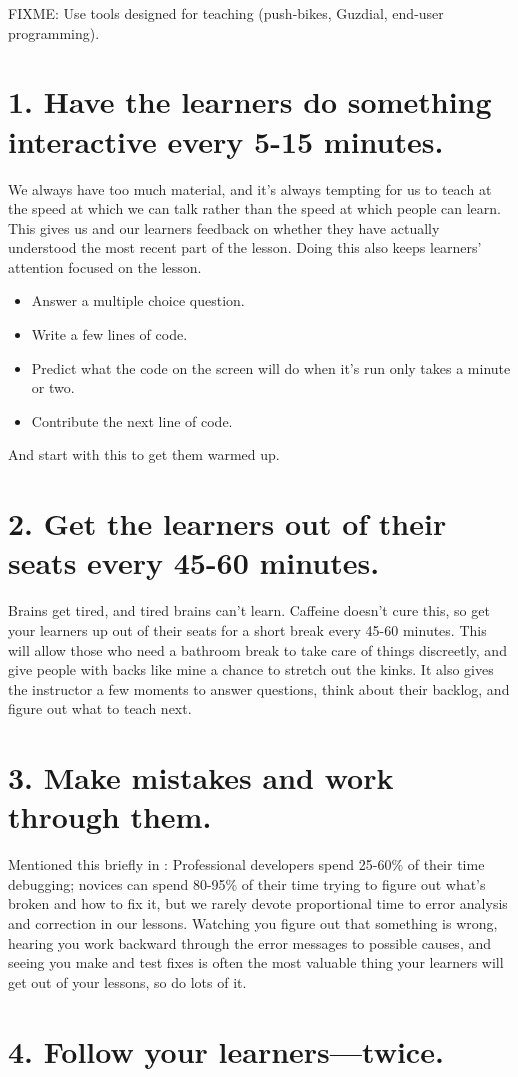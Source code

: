 \documentclass[10pt,letterpaper]{article}
\newcommand{\rulemajor}[1]{\section{#1}}
\begin{document}
\item FIXME: Use tools designed for teaching (push-bikes, Guzdial, end-user programming).

\rulemajor{1. Have the learners do something interactive every 5-15 minutes.}

We always have too much material,
and it's always tempting for us to teach at the speed at which we can talk
rather than the speed at which people can learn.
This gives us and our learners feedback on whether they have actually understood the most recent part of the lesson.
Doing this also keeps learners' attention focused on the lesson.

\begin{itemize}
\item Answer a multiple choice question.
\item Write a few lines of code.
\item Predict what the code on the screen will do when it's run only takes a minute or two.
\item Contribute the next line of code.
\end{itemize}

And start with this to get them warmed up.

\rulemajor{2. Get the learners out of their seats every 45-60 minutes.}

Brains get tired, and tired brains can't learn.
Caffeine doesn't cure this,
so get your learners up out of their seats for a short break every 45-60 minutes.
This will allow those who need a bathroom break to take care of things discreetly,
and give people with backs like mine a chance to stretch out the kinks.
It also gives the instructor a few moments to answer questions,
think about their backlog,
and figure out what to teach next.

\rulemajor{3. Make mistakes and work through them.}

Mentioned this briefly in \cite{Brow2018}:
Professional developers spend 25-60\% of their time debugging;
novices can spend 80-95\% of their time trying to figure out what's broken and how to fix it,
but we rarely devote proportional time to error analysis and correction in our lessons.
Watching you figure out that something is wrong,
hearing you work backward through the error messages to possible causes,
and seeing you make and test fixes is often the most valuable thing your learners will get out of your lessons,
so do lots of it.

\rulemajor{4. Follow your learners---twice.}
\end{document}
